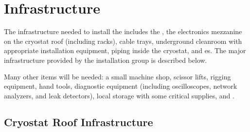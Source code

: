 \section{Infrastructure}
\label{sec:fdsp-tc-infr}





The infrastructure needed to install the  includes the , the electronics mezzanine on the cryostat roof (including racks), cable trays, underground cleanroom with appropriate installation equipment, piping inside the cryostat, and \coldbox{}es. The major infrastructure provided by the installation group is described below.  

Many other items will be needed: a small machine shop, scissor lifts, rigging equipment, hand tools, diagnostic equipment (including oscilloscopes, network analyzers, and leak detectors), local storage with some critical supplies, and .  




\subsection{Cryostat Roof Infrastructure}
\label{sec:fdsp-tc-infr-cryo-roof}



